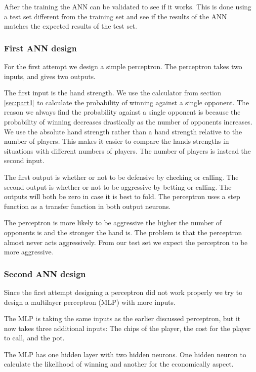 After the training the ANN can be validated to see if it works. This is done using a test set different from the training set and see if the results of the ANN matches the expected results of the test set.

\subsubsection{First ANN design}
For the first attempt we design a simple perceptron. The perceptron takes two inputs, and gives two outputs. 

The first input is the hand strength. We use the calculator from section \ref{sec:part1} to calculate the probability of winning against a single opponent. The reason we always find the probability against a single opponent is because the probability of winning decreases drastically as the number of opponents increases. We use the absolute hand strength rather than a hand strength relative to the number of players. 
This makes it easier to compare the hands strengths in situations with different numbers of players. The number of players is instead the second input.

The first output is whether or not to be defensive by checking or calling. The second output is whether or not to be aggressive by betting or calling. The outputs will both be zero in case it is best to fold. 
The perceptron uses a step function as a transfer function in both output neurons.


The perceptron is more likely to be aggressive the higher the number of opponents is and the stronger the hand is. The problem is that the perceptron almost never acts aggressively. From our test set we expect the perceptron to be more aggressive. 

\subsubsection{Second ANN design}
Since the first attempt designing a perceptron did not work properly we try to design a multilayer perceptron (MLP) with more inputs.

The MLP is taking the same inputs as the earlier discussed perceptron, but it now takes three additional inputs: The chips of the player, the cost for the player to call, and the pot.

The MLP has one hidden layer with two hidden neurons. One hidden neuron to calculate the likelihood of winning and another for the economically aspect.

